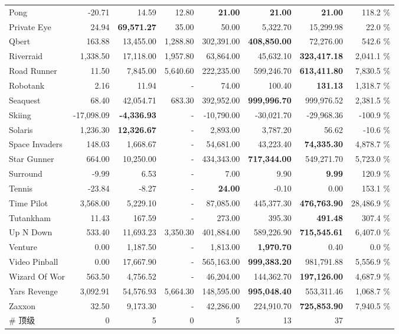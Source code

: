 \documentclass{article}
\begin{document}
\begin{table}
\begin{center}
\begin{tabularx}{0.900000\textwidth}{X| r r r r r r r}
Pong&-20.71 & 14.59 & 12.80 & \textbf{21.00} & \textbf{21.00} & \textbf{21.00} & 118.2 \%\\
Private Eye&24.94 & \textbf{69,571.27} & 35.00 & 50.00 & 5,322.70 & 15,299.98 & 22.0 \%\\
Qbert&163.88 & 13,455.00 & 1,288.80 & 302,391.00 & \textbf{408,850.00} & 72,276.00 & 542.6 \%\\
Riverraid&1,338.50 & 17,118.00 & 1,957.80 & 63,864.00 & 45,632.10 & \textbf{323,417.18} & 2,041.1 \%\\
Road Runner&11.50 & 7,845.00 & 5,640.60 & 222,235.00 & 599,246.70 & \textbf{613,411.80} & 7,830.5 \%\\
Robotank&2.16 & 11.94 & - & 74.00 & 100.40 & \textbf{131.13} & 1,318.7 \%\\
Seaquest&68.40 & 42,054.71 & 683.30 & 392,952.00 & \textbf{999,996.70} & 999,976.52 & 2,381.5 \%\\
Skiing&-17,098.09 & \textbf{-4,336.93} & - & -10,790.00 & -30,021.70 & -29,968.36 & -100.9 \%\\
Solaris&1,236.30 & \textbf{12,326.67} & - & 2,893.00 & 3,787.20 & 56.62 & -10.6 \%\\
Space Invaders&148.03 & 1,668.67 & - & 54,681.00 & 43,223.40 & \textbf{74,335.30} & 4,878.7 \%\\
Star Gunner&664.00 & 10,250.00 & - & 434,343.00 & \textbf{717,344.00} & 549,271.70 & 5,723.0 \%\\
Surround&-9.99 & 6.53 & - & 7.00 & 9.90 & \textbf{9.99} & 120.9 \%\\
Tennis&-23.84 & -8.27 & - & \textbf{24.00} & -0.10 & 0.00 & 153.1 \%\\
Time Pilot&3,568.00 & 5,229.10 & - & 87,085.00 & 445,377.30 & \textbf{476,763.90} & 28,486.9 \%\\
Tutankham&11.43 & 167.59 & - & 273.00 & 395.30 & \textbf{491.48} & 307.4 \%\\
Up N Down&533.40 & 11,693.23 & 3,350.30 & 401,884.00 & 589,226.90 & \textbf{715,545.61} & 6,407.0 \%\\
Venture&0.00 & 1,187.50 & - & 1,813.00 & \textbf{1,970.70} & 0.40 & 0.0 \%\\
Video Pinball&0.00 & 17,667.90 & - & 565,163.00 & \textbf{999,383.20} & 981,791.88 & 5,556.9 \%\\
Wizard Of Wor&563.50 & 4,756.52 & - & 46,204.00 & 144,362.70 & \textbf{197,126.00} & 4,687.9 \%\\
Yars Revenge&3,092.91 & 54,576.93 & 5,664.30 & 148,595.00 & \textbf{995,048.40} & 553,311.46 & 1,068.7 \%\\
Zaxxon&32.50 & 9,173.30 & - & 42,286.00 & 224,910.70 & \textbf{725,853.90} & 7,940.5 \%\\
\midrule
\# 顶级& 0 & 5 & 0 & 5 & 13 & 37\\
\bottomrule
\end{tabularx}
\end{center}



\end{table}
\end{document}
